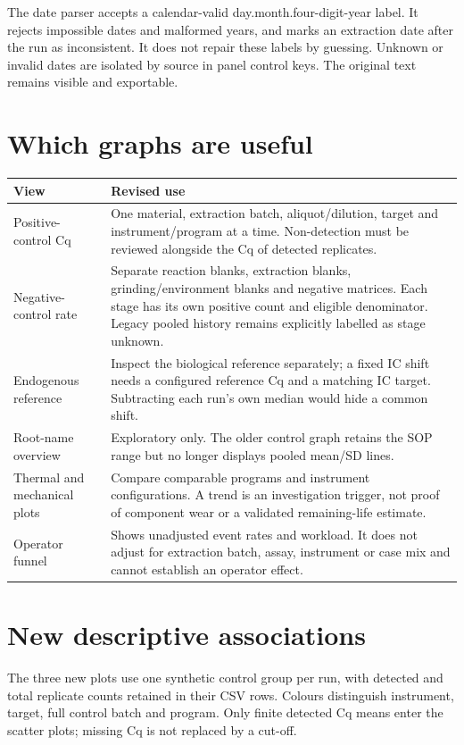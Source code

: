 The date parser accepts a calendar-valid day.month.four-digit-year label. It rejects impossible dates and malformed years,
and marks an extraction date after the run as inconsistent. It does not repair these labels by guessing. Unknown or invalid
dates are isolated by source in panel control keys. The original text remains visible and exportable.




\section{Which graphs are useful}
\begin{longtable}{@{}p{4cm}p{11cm}@{}}
\toprule View & Revised use\\\midrule\endhead
Positive-control Cq & One material, extraction batch, aliquot/dilution, target and instrument/program at a time. Non-detection
must be reviewed alongside the Cq of detected replicates.\\
Negative-control rate & Separate reaction blanks, extraction blanks, grinding/environment blanks and negative matrices.
Each stage has its own positive count and eligible denominator. Legacy pooled history remains explicitly labelled as stage unknown.\\
Endogenous reference & Inspect the biological reference separately; a fixed IC shift needs a configured reference Cq and a
matching IC target. Subtracting each run's own median would hide a common shift.\\
Root-name overview & Exploratory only. The older control graph retains the SOP range but no longer displays pooled mean/SD lines.\\
Thermal and mechanical plots & Compare comparable programs and instrument configurations. A trend is an investigation trigger,
not proof of component wear or a validated remaining-life estimate.\\
Operator funnel & Shows unadjusted event rates and workload. It does not adjust for extraction batch, assay, instrument or
case mix and cannot establish an operator effect.\\
\bottomrule
\end{longtable}

\section{New descriptive associations}
The three new plots use one synthetic control group per run, with detected and total replicate counts retained in their
CSV rows. Colours distinguish instrument, target, full control batch and program. Only finite detected Cq means enter the
scatter plots; missing Cq is not replaced by a cut-off.

